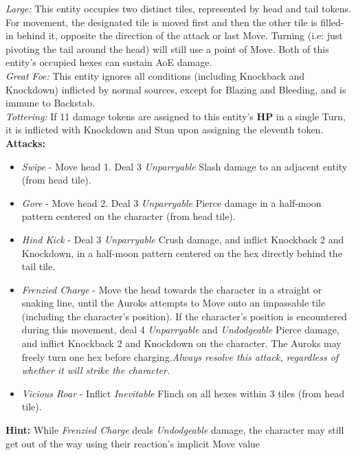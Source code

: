 \emph{Large:} This entity occupies two distinct tiles, represented by head and tail tokens. For movement, the designated tile is moved first and then the other tile is filled-in behind it, opposite the direction of the attack or last Move. Turning (i.e: just pivoting the tail around the head) will still use a point of Move. Both of this entity’s occupied hexes can sustain AoE damage.\\

\emph{Great Foe:} This entity ignores all conditions (including Knockback and Knockdown) inflicted by normal sources, except for Blazing and Bleeding, and is immune to Backstab.\\

\emph{Tottering:} If 11 damage tokens are assigned to this entity’s \textbf{HP} in a single Turn, it is inflicted with Knockdown and Stun upon assigning the eleventh token.\\

\textbf{Attacks:}
\begin{itemize}
\item \emph{Swipe} -  Move head 1. Deal 3 \emph{Unparryable} Slash damage to an adjacent entity (from head tile).
\item \emph{Gore} - Move head 2. Deal 3 \emph{Unparryable} Pierce damage in a half-moon pattern centered on the character (from head tile).
\item \emph{Hind Kick} - Deal 3 \emph{Unparryable} Crush damage, and inflict Knockback 2 and Knockdown, in a half-moon pattern centered on the hex directly behind the tail tile.
\item \emph{Frenzied Charge} - Move the head towards the character in a straight or snaking line, until the Auroks attempts to Move onto an impassable tile (including the character’s position). If the character’s position is encountered during this movement, deal 4 \emph{Unparryable} and \emph{Undodgeable} Pierce damage, and inflict Knockback 2 and Knockdown on the character. The Auroks may freely turn one hex before charging.\newline \emph{Always resolve this attack, regardless of whether it will strike the character.}
\item \emph{Vicious Roar} - Inflict \emph{Inevitable} Flinch on all hexes within 3 tiles (from head tile).
\end{itemize}

\begin{tcolorbox}
\textbf{Hint:} While \emph{Frenzied Charge} deals \emph{Undodgeable} damage, the character may still get out of the way using their reaction’s implicit Move value
\end{tcolorbox}

